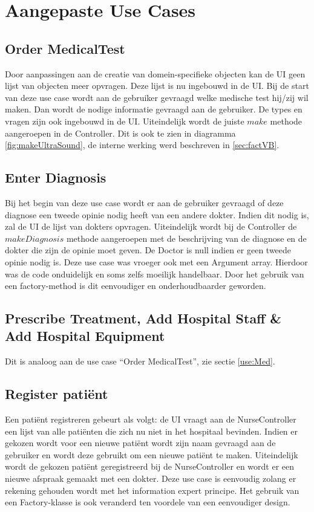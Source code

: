 \section{Aangepaste Use Cases\label{Volledig}}

\subsection{Order MedicalTest\label{use:Med}}
Door aanpassingen aan de creatie van domein-specifieke objecten kan de UI geen lijst van objecten meer opvragen. 
Deze lijst is nu ingebouwd in de UI. 
Bij de start van deze use case wordt aan de gebruiker gevraagd welke medische test hij/zij wil maken. 
Dan wordt de nodige informatie gevraagd aan de gebruiker. De types en vragen zijn ook ingebouwd in de UI.
Uiteindelijk wordt de juiste $make$ methode aangeroepen in de Controller. 
Dit is ook te zien in diagramma \ref{fig:makeUltraSound}, de interne werking werd beschreven in \ref{sec:factVB}.

\subsection{Enter Diagnosis}
Bij het begin van deze use case wordt er aan de gebruiker gevraagd of deze diagnose een tweede opinie nodig heeft van een andere dokter.
Indien dit nodig is, zal de UI de lijst van dokters opvragen. 
Uiteindelijk wordt bij de Controller de $makeDiagnosis$ methode aangeroepen met de beschrijving van de diagnose en de dokter die zijn de opinie moet geven.
De Doctor is null indien er geen tweede opinie nodig is.
Deze use case was vroeger ook met een Argument array. Hierdoor was de code onduidelijk en soms zelfs moeilijk handelbaar. 
Door het gebruik van een factory-method is dit eenvoudiger en onderhoudbaarder geworden.

\subsection{Prescribe Treatment, Add Hospital Staff \& Add Hospital Equipment}
Dit is analoog aan de use case ``Order MedicalTest'', zie sectie \ref{use:Med}. 

\subsection{Register patiënt}
Een patiënt registreren gebeurt als volgt: de UI vraagt aan de NurseController een lijst van alle patiënten die zich nu niet in het hospitaal bevinden.
Indien er gekozen wordt voor een nieuwe patiënt wordt zijn naam gevraagd aan de gebruiker en wordt deze gebruikt om een nieuwe patiënt te maken. 
Uiteindelijk wordt de gekozen patiënt geregistreerd bij de NurseController en wordt er een nieuwe afspraak gemaakt met een dokter.
Deze use case is eenvoudig zolang er rekening gehouden wordt met het information expert principe. 
Het gebruik van een Factory-klasse is ook veranderd ten voordele van een eenvoudiger design.


